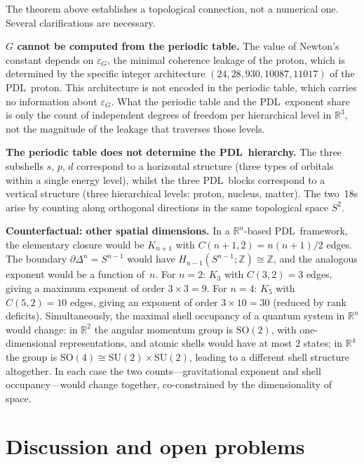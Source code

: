 \documentclass[11pt,a4paper]{article}
\theoremstyle{definition}
\newcommand{\PDL}{\textnormal{PDL}}
\newcommand{\epsg}{\varepsilon_G}
\begin{document}
The theorem above establishes a topological connection, not a numerical one. Several clarifications are necessary.

\medskip\noindent\textbf{$G$ cannot be computed from the periodic table.} The value of Newton's constant depends on $\epsg$, the minimal coherence leakage of the proton, which is determined by the specific integer architecture $(24, 28, 930, 10087, 11017)$ of the \PDL\ proton. This architecture is not encoded in the periodic table, which carries no information about $\epsg$. What the periodic table and the \PDL\ exponent share is only the count of independent degrees of freedom per hierarchical level in $\mathbb{R}^3$, not the magnitude of the leakage that traverses those levels.

\medskip\noindent\textbf{The periodic table does not determine the \PDL\ hierarchy.} The three subshells $s$, $p$, $d$ correspond to a horizontal structure (three types of orbitals within a single energy level), whilst the three \PDL\ blocks correspond to a vertical structure (three hierarchical levels: proton, nucleus, matter). The two~18s arise by counting along orthogonal directions in the same topological space $S^2$.

\medskip\noindent\textbf{Counterfactual: other spatial dimensions.} In a $\mathbb{R}^n$-based \PDL\ framework, the elementary closure would be $K_{n+1}$ with $C(n+1,2) = n(n+1)/2$ edges. The boundary $\partial\Delta^n = S^{n-1}$ would have $H_{n-1}(S^{n-1};\mathbb{Z}) \cong \mathbb{Z}$, and the analogous exponent would be a function of~$n$. For $n = 2$: $K_3$ with $C(3,2) = 3$ edges, giving a maximum exponent of order $3 \times 3 = 9$. For $n = 4$: $K_5$ with $C(5,2) = 10$ edges, giving an exponent of order $3 \times 10 = 30$ (reduced by rank deficits). Simultaneously, the maximal shell occupancy of a quantum system in $\mathbb{R}^n$ would change: in $\mathbb{R}^2$ the angular momentum group is $\mathrm{SO}(2)$, with one-dimensional representations, and atomic shells would have at most $2$ states; in $\mathbb{R}^4$ the group is $\mathrm{SO}(4) \cong \mathrm{SU}(2) \times \mathrm{SU}(2)$, leading to a different shell structure altogether. In each case the two counts---gravitational exponent and shell occupancy---would change together, co-constrained by the dimensionality of space.

\section{Discussion and open problems}
\label{sec:discussion}
\end{document}
